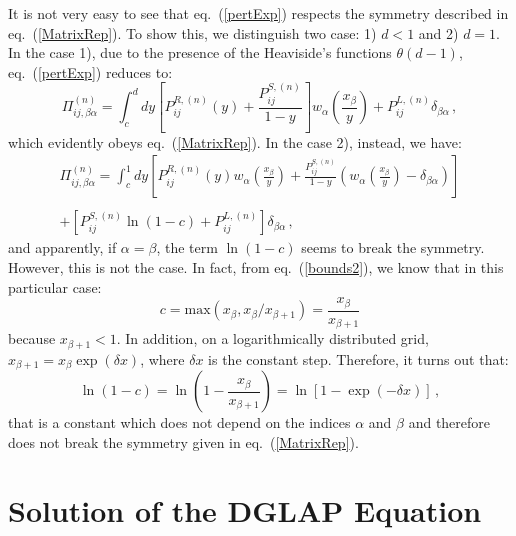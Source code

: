 \documentclass[10pt,a4paper]{article}
\begin{document}
It is not very easy to see that eq.~(\ref{pertExp}) respects the symmetry described in eq.~(\ref{MatrixRep}). To show this, we distinguish two case: 1) $d < 1$ and 2) $d = 1$. In the case 1), due to the presence of the Heaviside's functions $\theta(d-1)$, eq.~(\ref{pertExp}) reduces to:
\begin{equation}
\Pi_{ij,\beta\alpha}^{(n)} =
\int^{d}_{c}dy\left[{P}_{ij}^{R,(n)}(y)+\frac{{P}_{ij}^{S,(n)}}{1-y}\right]w_{\alpha}\left(\frac{x_\beta}{y}\right)
+ {P}_{ij}^{L,(n)}\delta_{\beta\alpha}\,,
\label{pertExp2}
\end{equation}
which evidently obeys eq.~(\ref{MatrixRep}). In the case 2), instead, we have:
\begin{equation}
\begin{array}{c}
\displaystyle \Pi_{ij,\beta\alpha}^{(n)} = \int^{1}_{c}dy\left[{P}_{ij}^{R,(n)}(y)w_{\alpha}\left(\frac{x_\beta}{y}\right)+\frac{{P}_{ij}^{S,(n)}}{1-y}\left(w_{\alpha}\left(\frac{x_\beta}{y}\right)-\delta_{\beta\alpha}\right)\right]\\
\\
\displaystyle +\left[{P}_{ij}^{S,(n)}\ln(1-c)+{P}_{ij}^{L,(n)}\right]\delta_{\beta\alpha}\,,
\end{array}
\label{pertExp3}
\end{equation}
and apparently, if $\alpha=\beta$, the term $\ln(1-c)$ seems to break the symmetry. However, this is not the case. In fact, from eq.~(\ref{bounds2}), we know that in this particular case:
\begin{equation}
c = \mbox{max}(x_\beta,x_\beta/x_{\beta+1}) = \frac{x_\beta}{x_{\beta+1}}
\end{equation}
because $x_{\beta+1}<1$. In addition, on a logarithmically distributed grid, $x_{\beta+1}=x_{\beta}\exp(\delta x)$, where $\delta x$ is the constant step. Therefore, it turns out that:
\begin{equation}
\ln(1-c) = \ln\left(1-\frac{x_{\beta}}{x_{\beta+1}}\right) = \ln[1 - \exp(-\delta x)]\,,
\end{equation}
that is a constant which does not depend on the indices $\alpha$ and $\beta$ and therefore does not break the symmetry given in eq.~(\ref{MatrixRep}).


\section{Solution of the DGLAP Equation}
\end{document}

